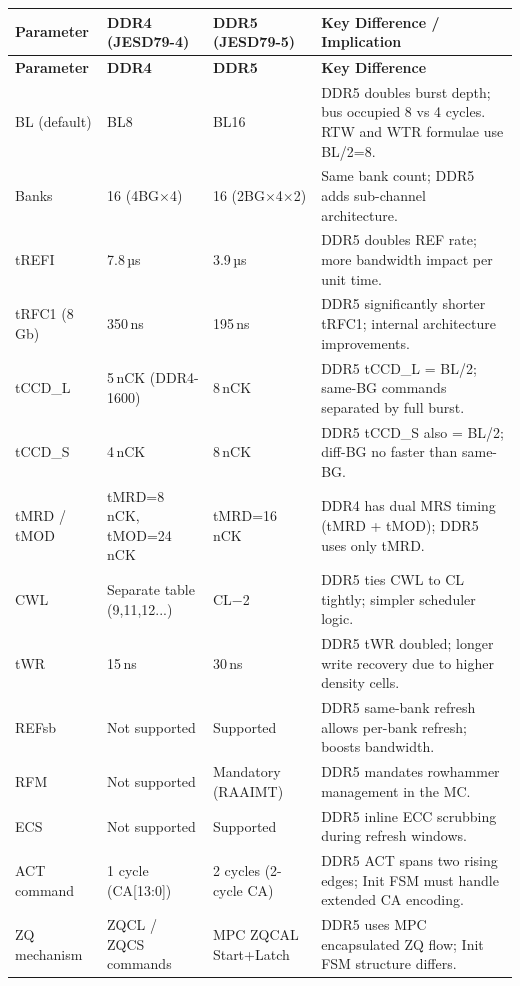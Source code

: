 \documentclass[11pt,a4paper]{article}
\begin{document}
\begin{longtable}{L{2.5cm} L{3.2cm} L{3.2cm} L{5.6cm}}
\toprule
\textbf{Parameter} & \textbf{DDR4 (JESD79-4)} & \textbf{DDR5 (JESD79-5)} & \textbf{Key Difference / Implication} \\
\midrule
\endfirsthead
\toprule
\textbf{Parameter} & \textbf{DDR4} & \textbf{DDR5} & \textbf{Key Difference} \\
\midrule
\endhead
\bottomrule
\endfoot

BL (default) & BL8 & BL16 & DDR5 doubles burst depth; bus occupied 8 vs 4 cycles. RTW and WTR formulae use BL/2=8. \\
Banks & 16 (4BG$\times$4) & 16 (2BG$\times$4$\times$2) & Same bank count; DDR5 adds sub-channel architecture. \\

tREFI & 7.8\,µs & 3.9\,µs & DDR5 doubles REF rate; more bandwidth impact per unit time. \\
tRFC1 (8\,Gb) & 350\,ns & 195\,ns & DDR5 significantly shorter tRFC1; internal architecture improvements. \\

tCCD\_L & 5\,nCK (DDR4-1600) & 8\,nCK & DDR5 tCCD\_L = BL/2; same-BG commands separated by full burst. \\
tCCD\_S & 4\,nCK & 8\,nCK & DDR5 tCCD\_S also = BL/2; diff-BG no faster than same-BG. \\

tMRD / tMOD & tMRD=8\,nCK, tMOD=24\,nCK & tMRD=16\,nCK & DDR4 has dual MRS timing (tMRD + tMOD); DDR5 uses only tMRD. \\
CWL & Separate table (9,11,12...) & CL$-$2 & DDR5 ties CWL to CL tightly; simpler scheduler logic. \\

tWR & 15\,ns & 30\,ns & DDR5 tWR doubled; longer write recovery due to higher density cells. \\
REFsb & Not supported & Supported & DDR5 same-bank refresh allows per-bank refresh; boosts bandwidth. \\

RFM & Not supported & Mandatory (RAAIMT) & DDR5 mandates rowhammer management in the MC. \\
ECS & Not supported & Supported & DDR5 inline ECC scrubbing during refresh windows. \\

ACT command & 1 cycle (CA[13:0]) & 2 cycles (2-cycle CA) & DDR5 ACT spans two rising edges; Init FSM must handle extended CA encoding. \\
ZQ mechanism & ZQCL / ZQCS commands & MPC ZQCAL Start+Latch & DDR5 uses MPC encapsulated ZQ flow; Init FSM structure differs. \\
\end{longtable}
\end{document}
